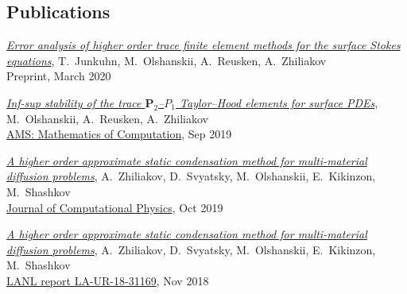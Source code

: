 \documentclass[a4paper,12pt]{article}
\begin{document}
	\subsection*{Publications}
	
	\begin{etaremune}[topsep=0pt]
		\item \textit{\href{https://arxiv.org/abs/2003.06972}{Error analysis of higher order trace finite element methods for the surface Stokes equations}}, T.~Junkuhn, M.~Olshanskii, A.~Reusken, A.~Zhiliakov\\ Preprint, March 2020
		\item \textit{\href{https://arxiv.org/abs/1909.02990}{Inf-sup stability of the trace $\mathbf P_2$--$P_1$ Taylor--Hood elements for surface PDEs}}, M.~Olshanskii, A.~Reusken, A.~Zhiliakov\\ \href{https://doi.org/10.1090/mcom/3551}{AMS: Mathematics of Computation}, Sep 2019 
		\item \textit{\href{https://www.researchgate.net/publication/333900759_A_higher_order_approximate_static_condensation_method_for_multi-material_diffusion_problems}{A higher order approximate static condensation method for multi-material diffusion problems}}, A.~Zhiliakov, D.~Svyatsky, M.~Olshanskii, E.~Kikinzon, M.~Shashkov\\ \href{https://doi.org/10.1016/j.jcp.2019.06.044}{Journal of Computational Physics}, Oct 2019 
		\item \textit{\href{https://www.researchgate.net/publication/329327346_A_higher_order_approximate_static_condensation_method_for_multi-material_diffusion_problems}{A higher order approximate static condensation method for multi-material diffusion problems}}, A.~Zhiliakov, D.~Svyatsky, M.~Olshanskii, E.~Kikinzon, M.~Shashkov\\ \href{https://permalink.lanl.gov/object/tr?what=info:lanl-repo/lareport/LA-UR-18-31169}{LANL report LA-UR-18-31169}, Nov 2018 

\end{etaremune}
\end{document}
